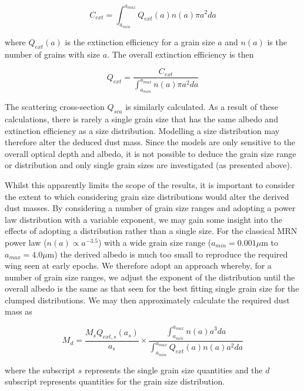 \documentclass[useAMS,usenatbib,usegraphicx]{mnras}
\begin{document}
\begin{equation}
 C_{ext}=\int^{a_{max}}_{a_{min}} Q_{ext}(a) n(a) \pi a^2 da 
 \end{equation}

where $Q_{ext}(a)$ is the extinction efficiency for a grain size $a$ and $n(a)$ is the number of grains with size $a$. The overall extinction efficiency is then

\begin{equation}
 Q_{ext} = \frac{C_{ext}}{ \int^{a_{max}}_{a_{min}} n(a) \pi a^2 da} 
 \end{equation}
 
 


 
The scattering cross-section $Q_{sca}$ is similarly calculated.  As a result of these calculations, there is rarely a single grain size that has the same albedo and extinction efficiency as a size distribution.  Modelling a size distribution may therefore alter the deduced dust mass.  Since the models are only sensitive to the overall optical depth and albedo, it is not possible to deduce the grain size range or distribution and only single grain sizes are investigated (as presented above).

Whilst this apparently limits the scope of the results, it is important to consider the extent to which considering grain size distributions would alter the derived dust masses.  By considering a number of grain size ranges and adopting a power law distribution with a variable exponent, we may gain some insight into the effects of adopting a distribution rather than a single size.  For the classical MRN power law ($n(a) \propto a^{-3.5}$) with a wide grain size range ($a_{min} = 0.001 \mu$m to $a_{max} = 4.0 \mu$m) the derived albedo is much too small to reproduce the required wing seen at early epochs.  We therefore adopt an approach whereby, for a number of grain size ranges, we adjust the exponent of the distribution until the overall albedo is the same as that seen for the best fitting single grain size for the clumped distributions.  We may then approximately calculate the required dust mass as

\begin{equation}
\label{distn_conv}
M_{d}= \frac{M_s Q_{ext,s}(a_s)}{a_s} \times \frac{\int^{a_{max}}_{a_{min}} n(a) a^3 da}{\int^{a_{max}}_{a_{min}} Q_{ext}(a) n(a) a^2 da}
\end{equation}

where the subscript $s$ represents the single grain size quantities and the $d$ subscript represents quantities for the grain size distribution.  
\end{document}
